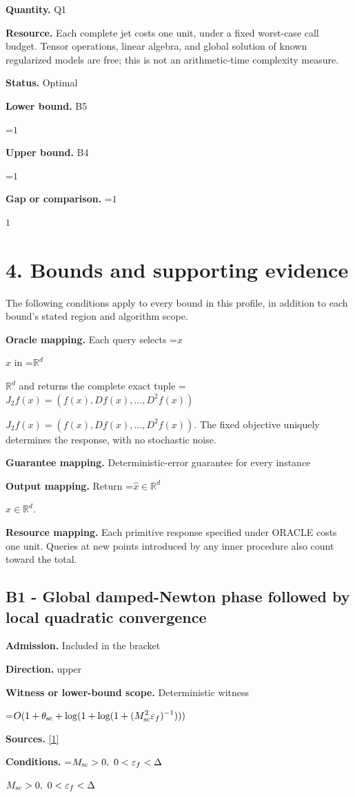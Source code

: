 \documentclass[10pt,a4paper]{article}
\newcommand{\AtlasMath}[1]{\par\begingroup\centering\setbox0=\hbox{$\displaystyle #1$}\ifdim\wd0>1.4\linewidth\typeout{ATLAS WIDE FORMULA: \the\wd0}\fi\ifdim\wd0>\linewidth\resizebox{\linewidth}{!}{\box0}\else\box0\fi\par\endgroup}
\newcommand{\AtlasInlineMath}[1]{\begingroup\setbox0=\hbox{$#1$}\ifdim\wd0>.4\linewidth\endgroup\AtlasMath{#1}\else\endgroup$#1$\fi}
\begin{document}
\textbf{Quantity.} Q1

\textbf{Resource.} Each complete jet costs one unit, under a fixed worst-case call budget. Tensor operations, linear algebra, and global solution of known regularized models are free; this is not an arithmetic-time complexity measure.

\textbf{Status.} Optimal

\textbf{Lower bound.} B5

\AtlasMath{1}
\textbf{Upper bound.} B4

\AtlasMath{1}
\textbf{Gap or comparison.} \AtlasInlineMath{1}

\section{4. Bounds and supporting evidence}
The following conditions apply to every bound in this profile, in addition to each bound's stated region and algorithm scope.

\textbf{Oracle mapping.} Each query selects \AtlasInlineMath{x} in \AtlasInlineMath{\mathbb{R}^d} and returns the complete exact tuple \AtlasInlineMath{J_{2}f(x)=(f(x),Df(x),\ldots,D^{2}f(x))}. The fixed objective uniquely determines the response, with no stochastic noise.

\textbf{Guarantee mapping.} Deterministic-error guarantee for every instance

\textbf{Output mapping.} Return \AtlasInlineMath{\widehat{x}\in \mathbb{R}^d}.

\textbf{Resource mapping.} Each primitive response specified under ORACLE costs one unit. Queries at new points introduced by any inner procedure also count toward the total.

\subsection{B1 - Global damped-Newton phase followed by local quadratic convergence}
\textbf{Admission.} Included in the bracket

\textbf{Direction.} upper

\textbf{Witness or lower-bound scope.} Deterministic witness

\AtlasMath{O(1+\theta_{\rm sc}+\log(1+\log(1+(M_{\rm sc}^2\varepsilon_f)^{-1})))}
\textbf{Sources.} \href{https://arxiv.org/pdf/2408.11022v1}{[1]}

\textbf{Conditions.} \AtlasInlineMath{M_{\rm sc}>0,\ 0<\varepsilon_f<\Delta}
\end{document}
